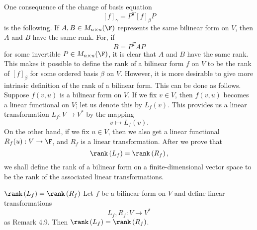 \documentclass[linearalgebraII]{subfiles}
\begin{document}
    \begin{remark}
        One consequence of the change of basis equation
        \begin{equation*}
            \left[ f \right] _\gamma = P^T\left[ f \right] _\beta P
        \end{equation*}
        is the following. If $A,B\in M_{n\times n}(\F)$ represents the same bilinear form on $V$, then $A$ and $B$ have the same rank. For, if
        \begin{equation*}
            B = P^TAP
        \end{equation*}
        for some invertible $P\in M_{n\times n}(\F)$, it is clear that $A$ and $B$ have the same rank. This makes it possible to define the rank of a bilinear form $f$ on $V$ to be the rank of $\left[ f \right] _\beta$ for some ordered basis $\beta$ on $V$. However, it is more desirable to give more intrinsic definition of the rank of a bilinear form. This can be done as follows. Suppose $f\left( v,u \right)$ is a bilinear form on $V$. If we fix $v\in V$, then $f(v,u)$ becomes a linear functional on $V$; let us denote this by $L_f(v)$. This provides us a linear transformation $L_f:V\to V^*$ by the mapping
        \begin{equation*}
            v\mapsto L_f(v).
        \end{equation*}
        On the other hand, if we fix $u\in V$, then we also get a linear functional $R_f(u):V\to \F$, and $R_f$ is a linear transformation. After we prove that
        \begin{equation*}
            \rank\left( L_f \right) = \rank\left( R_f \right),
        \end{equation*}
        we shall define the rank of a bilinear form on a finite-dimensional vector space to be the rank of the associated linear transformations.
    \end{remark}

    \begin{prop}{$\rank\left( L_f \right) = \rank\left( R_f \right)$}
        Let $f$ be a bilinear form on $V$ and define linear transformations
        \begin{equation*}
            L_f,R_f:V\to V^*
        \end{equation*}
        as Remark 4.9. Then $\rank\left( L_f \right) = \rank\left( R_f \right)$.
    \end{prop}
\end{document}
